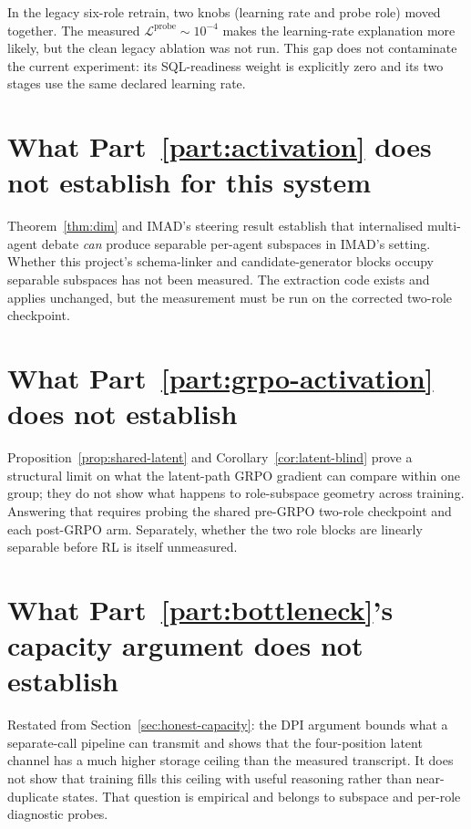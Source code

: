 \documentclass[11pt]{article}
\theoremstyle{definition}
\begin{document}
In the legacy six-role retrain, two knobs (learning rate and probe role) moved together. The measured $\mathcal{L}^{\mathrm{probe}}\sim10^{-4}$ makes the learning-rate explanation more likely, but the clean legacy ablation was not run. This gap does not contaminate the current experiment: its SQL-readiness weight is explicitly zero and its two stages use the same declared learning rate.

\section{What Part~\ref{part:activation} does not establish for this system}

Theorem~\ref{thm:dim} and IMAD's steering result establish that internalised multi-agent debate \emph{can} produce separable per-agent subspaces in IMAD's setting. Whether this project's schema-linker and candidate-generator blocks occupy separable subspaces has not been measured. The extraction code exists and applies unchanged, but the measurement must be run on the corrected two-role checkpoint.

\section{What Part~\ref{part:grpo-activation} does not establish}

Proposition~\ref{prop:shared-latent} and Corollary~\ref{cor:latent-blind} prove a structural limit on what the latent-path GRPO gradient can compare within one group; they do not show what happens to role-subspace geometry across training. Answering that requires probing the shared pre-GRPO two-role checkpoint and each post-GRPO arm. Separately, whether the two role blocks are linearly separable before RL is itself unmeasured.

\section{What Part~\ref{part:bottleneck}'s capacity argument does not establish}

Restated from Section~\ref{sec:honest-capacity}: the DPI argument bounds what a separate-call pipeline can transmit and shows that the four-position latent channel has a much higher storage ceiling than the measured transcript. It does not show that training fills this ceiling with useful reasoning rather than near-duplicate states. That question is empirical and belongs to subspace and per-role diagnostic probes.
\end{document}
